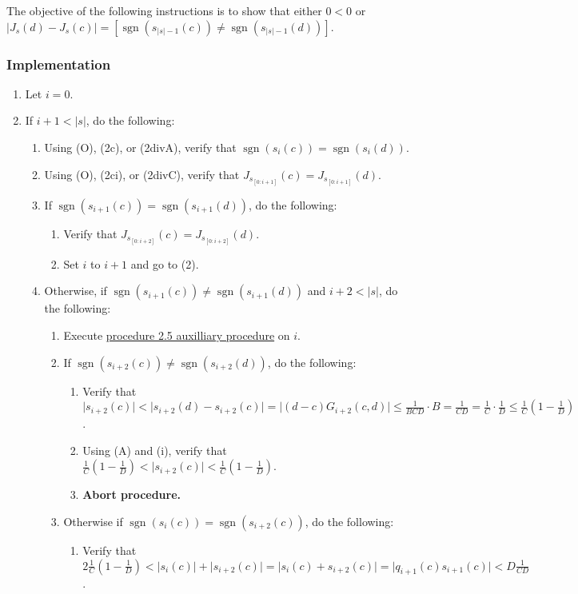 \documentclass[twocolumn]{article}
\DeclareMathOperator{\sgn}{sgn}
\newcommand{\implementation}{\subsubsection*{Implementation}}
\begin{document}
				The objective of the following instructions is to show that either $0<0$ or $\lvert J_{s}(d)-J_{s}(c)\rvert=[\sgn(s_{\lvert s\rvert-1}(c))\ne\sgn(s_{\lvert s\rvert-1}(d))]$.
			\implementation
				\begin{enumerate}
					\item Let $i=0$.
					\item If $i+1<\lvert s\rvert$, do the following:
					\begin{enumerate}
						\item Using (O), (2c), or (2divA), verify that $\sgn(s_i(c))=\sgn(s_i(d))$.
						\item Using (O), (2ci), or (2divC), verify that $J_{s_{[0:i+1]}}(c)=J_{s_{[0:i+1]}}(d)$.
						\item If $\sgn(s_{i+1}(c))=\sgn(s_{i+1}(d))$, do the following:
						\begin{enumerate}
							\item Verify that $J_{s_{[0:i+2]}}(c)=J_{s_{[0:i+2]}}(d)$.
							\item Set $i$ to $i+1$ and go to (2).
						\end{enumerate}
						\item Otherwise, if $\sgn(s_{i+1}(c))\ne\sgn(s_{i+1}(d))$ and $i+2<\lvert s\rvert$, do the following:
						\begin{enumerate}
							\item Execute \hyperref[sec:procedure 2.5 auxilliary procedure]{procedure 2.5 auxilliary procedure} on $i$.
							\item If $\sgn(s_{i+2}(c))\ne\sgn(s_{i+2}(d))$, do the following:
							\begin{enumerate}
								\item Verify that $\lvert s_{i+2}(c)\rvert<\lvert s_{i+2}(d)-s_{i+2}(c)\rvert=\lvert (d-c)G_{i+2}(c,d)\rvert\le\frac{1}{BCD}\cdot B=\frac{1}{CD}=\frac{1}{C}\cdot\frac{1}{D}\le\frac{1}{C}(1-\frac{1}{D})$.
								\item Using (A) and (i), verify that $\frac{1}{C}(1-\frac{1}{D})<\lvert s_{i+2}(c)\rvert<\frac{1}{C}(1-\frac{1}{D})$.
								\item \textbf{Abort procedure.}
							\end{enumerate}
							\item Otherwise if $\sgn(s_i(c))=\sgn(s_{i+2}(c))$, do the following:
							\begin{enumerate}
								\item Verify that $2\frac{1}{C}(1-\frac{1}{D})<\lvert s_i(c)\rvert+\lvert s_{i+2}(c)\rvert=\lvert s_i(c)+s_{i+2}(c)\rvert=\lvert q_{i+1}(c)s_{i+1}(c)\rvert<D\frac{1}{CD}$.

\end{enumerate}
\end{enumerate}
\end{enumerate}
\end{enumerate}
\end{document}
